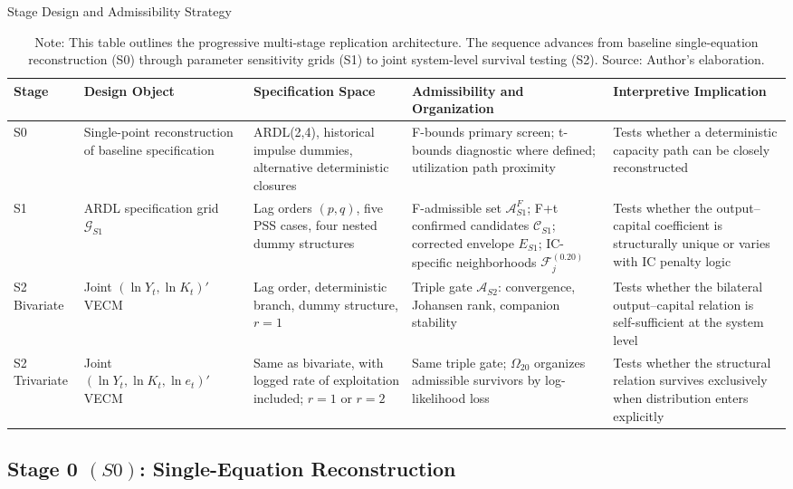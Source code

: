 \documentclass[11pt]{article}
\begin{document}
\begin{table}[h!]
\centering
\scriptsize
\caption{Stage Design and Admissibility Strategy}
\label{tab:cross_stage_synthesis}
\begin{tabular}{@{}>{\raggedright\arraybackslash}p{1.6cm}>{\raggedright\arraybackslash}p{2.6cm}>{\raggedright\arraybackslash}p{3.0cm}>{\raggedright\arraybackslash}p{3.2cm}>{\raggedright\arraybackslash}p{3.2cm}@{}}
\toprule
Stage & Design Object & Specification Space & Admissibility and Organization & Interpretive Implication \\
\midrule
\midrule
S0 & Single-point reconstruction of baseline specification & ARDL(2,4), historical impulse dummies, alternative deterministic closures & F-bounds primary screen; t-bounds diagnostic where defined; utilization path proximity & Tests whether a deterministic capacity path can be closely reconstructed \\
S1 & ARDL specification grid $\mathcal{G}_{S1}$ & Lag orders $(p,q)$, five PSS cases, four nested dummy structures & F-admissible set $\mathcal{A}^{F}_{S1}$; F+t confirmed candidates $\mathcal{C}_{S1}$; corrected envelope $E_{S1}$; IC-specific neighborhoods $\mathcal{F}^{(0.20)}_j$ & Tests whether the output--capital coefficient is structurally unique or varies with IC penalty logic \\
S2 Bivariate & Joint $(\ln Y_t, \ln K_t)'$ VECM & Lag order, deterministic branch, dummy structure, $r=1$ & Triple gate $\mathcal{A}_{S2}$: convergence, Johansen rank, companion stability & Tests whether the bilateral output--capital relation is self-sufficient at the system level \\
S2 Trivariate & Joint $(\ln Y_t, \ln K_t, \ln e_t)'$ VECM & Same as bivariate, with logged rate of exploitation included; $r=1$ or $r=2$ & Same triple gate; $\Omega_{20}$ organizes admissible survivors by log-likelihood loss & Tests whether the structural relation survives exclusively when distribution enters explicitly \\
\bottomrule
\end{tabular}
\caption*{Note: This table outlines the progressive multi-stage replication architecture. The sequence advances from baseline single-equation reconstruction (S0) through parameter sensitivity grids (S1) to joint system-level survival testing (S2). Source: Author's elaboration.}
\end{table}

\subsection{Stage 0 \texorpdfstring{$(S0)$}{}: Single-Equation Reconstruction}
\label{subsec:S0_reconstruction}
\end{document}
